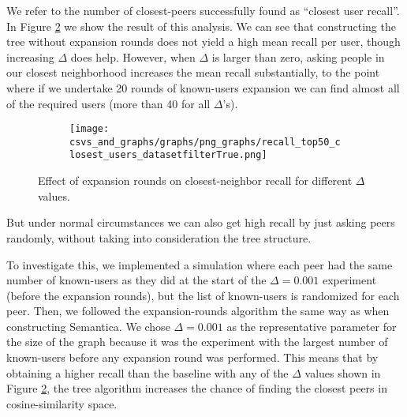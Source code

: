 \documentclass[10pt,journal]{IEEEtran}
\begin{document}
We refer to the number of closest-peers successfully found as ``closest user recall''. In Figure \ref{fig:cc-perexpansion} we show the result of this analysis. We can see that constructing the tree without expansion rounds does not yield a high mean recall per user, though increasing $\Delta$ does help. However, when $\Delta$ is larger than zero, asking people in our closest neighborhood increases the mean recall substantially, to the point where if we undertake 20 rounds of known-users expansion we can find almost all of the required users (more than 40 for all $\Delta$'s).


%             
\begin{figure}
    \centering
    \begin{subfigure}[b]{0.45\textwidth} %
        \texttt{[image: csvs\_and\_graphs/graphs/png\_graphs/recall\_top50\_closest\_users\_datasetfilterTrue.png]}
        \label{fig:recall/nbr_known_users_filterFalse}
    \end{subfigure}
    \hfill
    \caption{Effect of expansion rounds on closest-neighbor recall for different $\Delta$ values.}
    \label{fig:cc-perexpansion}
\end{figure}




But under normal circumstances we can also get high recall by just asking peers randomly, without taking into consideration the tree structure.

To investigate this, we implemented a simulation where each peer had the same number of known-users as they did at the start of the $\Delta=0.001$ experiment (before the expansion rounds), but the list of known-users is randomized for each peer. Then, we followed the expansion-rounds algorithm the same way as when constructing Semantica. We chose $\Delta=0.001$ as the representative parameter for the size of the graph because it was the experiment with the largest number of known-users before any expansion round was performed. This means that by obtaining a higher recall than the baseline with any of the $\Delta$ values shown in Figure \ref{fig:cc-perexpansion}, the tree algorithm increases the chance of finding the closest peers in cosine-similarity space.
\end{document}
